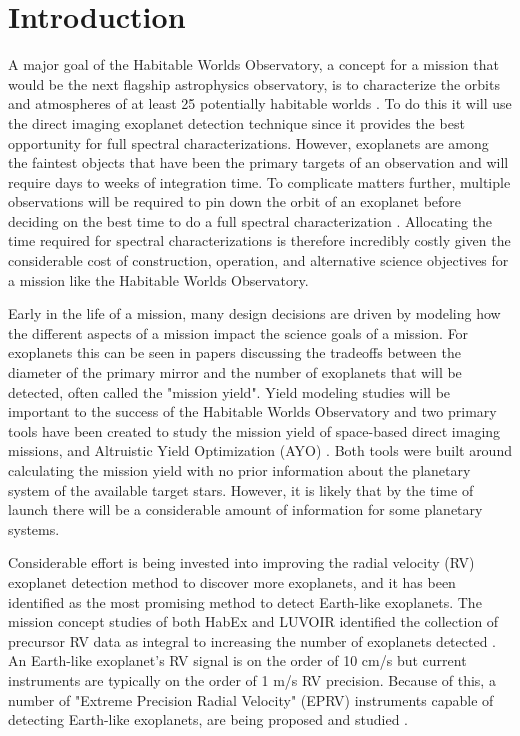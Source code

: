 \section{Introduction}
A major goal of the Habitable Worlds Observatory, a concept for a mission that
would be the next flagship astrophysics observatory, is to characterize the orbits
and atmospheres of at least 25 potentially habitable worlds \citep{GreatObservatory}. To do this it will use
the direct imaging exoplanet detection technique since it provides the best
opportunity for full spectral characterizations. However, exoplanets are among
the faintest objects that have been the primary targets of an observation and
will require days to weeks of integration time. To complicate matters further,
multiple observations will be required to pin down the orbit of an exoplanet
before deciding on the best time to do a full spectral characterization \citep{horningMinimumNumber2019}.
Allocating the time required for spectral characterizations is therefore
incredibly costly given the considerable cost of construction, operation, and
alternative science objectives for a mission like the Habitable Worlds
Observatory.

Early in the life of a mission, many design decisions are driven by modeling
how the different aspects of a mission impact the science goals of a mission.
For exoplanets this can be seen in papers discussing the tradeoffs between the
diameter of the primary mirror and the number of exoplanets  that will be
detected, often called the "mission yield". Yield modeling studies will be
important to the success of the Habitable Worlds Observatory and two primary
tools have been created to study the mission yield of space-based direct
imaging missions, 
\citep{savranskyEXOSIMSExoplanetOpenSource2017} and Altruistic Yield
Optimization (AYO) \citep{starkMaximizingExoEarthCandidate2014}. Both tools
were built around calculating the mission yield with no prior information about
the planetary system of the available target stars. However, it is likely that
by the time of launch there will be a considerable amount of information for
some planetary systems.

Considerable effort is being invested into improving the radial velocity (RV)
exoplanet detection method to discover more exoplanets, and it has been
identified as the most promising method to detect Earth-like exoplanets. The
mission concept studies of both HabEx and LUVOIR identified the collection of
precursor RV data as integral to increasing the number of exoplanets detected
\citep{gaudiHabitableExoplanetObservatory2020, TheLUVOIRTeam2019}. An
Earth-like exoplanet's RV signal is on the order of 10 cm/s but current
instruments are typically on the order of 1 m/s RV precision. Because of
this, a number of "Extreme Precision Radial Velocity" (EPRV) instruments capable of detecting Earth-like exoplanets, are being proposed and
studied \citep{Crass2021}.

